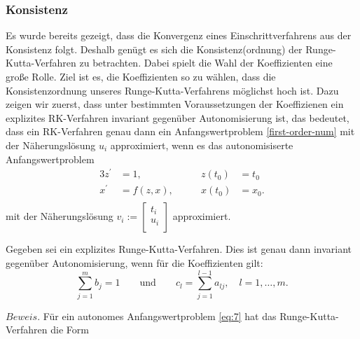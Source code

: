 \subsubsection{Konsistenz}
Es wurde bereits gezeigt, dass die Konvergenz eines Einschrittverfahrens aus der Konsistenz folgt. Deshalb genügt es
sich die Konsistenz(ordnung) der Runge-Kutta-Verfahren zu betrachten. Dabei spielt die Wahl der Koeffizienten eine
große Rolle. Ziel ist es, die Koeffizienten so zu wählen, dass die Konsistenzordnung unseres Runge-Kutta-Verfahrens
möglichst hoch ist. Dazu zeigen wir zuerst, dass unter bestimmten Voraussetzungen der Koeffizienen ein explizites
RK-Verfahren invariant gegenüber Autonomisierung ist, das bedeutet, dass ein RK-Verfahren genau dann ein
Anfangswertproblem \eqref{first-order-num} mit der Näherungslösung $u_i$ approximiert, wenn es das autonomisiserte
Anfangswertproblem
\begin{alignat}{3}
    z^{\prime} &= 1, \qquad &z(t_0) &= t_0 \\       \label{eq:7}
    x^{\prime} &= f(z,x),\qquad  &x(t_0) &= x_0. \nonumber \\ \nonumber
\end{alignat}
mit der Näherungslösung $v_i := \left[ \begin{matrix}
                                           t_i\\
                                           u_i\\
\end{matrix} \right]$
approximiert.
\begin{satz}
    Gegeben sei ein explizites Runge-Kutta-Verfahren. Dies ist genau dann invariant gegenüber Autonomisierung, wenn
    für die Koeffizienten gilt:
    \[
        \sum_{j=1}^{m} b_j = 1 \qquad \text{und} \qquad c_l=\sum_{j=1}^{l-1} a_{lj}, \quad l = 1, \dots, m.
    \]
\end{satz}
$Beweis.$ Für ein autonomes Anfangswertproblem \eqref{eq:7} hat das Runge-Kutta-Verfahren die Form
